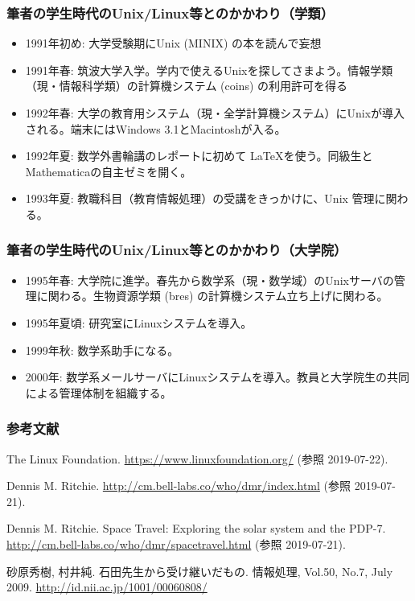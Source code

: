 \documentclass[dvipdfmx]{beamer}
\begin{document}
\begin{frame}%
    \frametitle{筆者の学生時代のUnix/Linux等とのかかわり（学類）}
    \begin{itemize}
        \item<1-> 1991年初め: 大学受験期にUnix (MINIX) の本を読んで妄想
        \item<2-> 1991年春: 筑波大学入学。学内で使えるUnixを探してさまよう。情報学類（現・情報科学類）の計算機システム (coins) の利用許可を得る
        \item<3-> 1992年春: 大学の教育用システム（現・全学計算機システム）にUnixが導入される。端末にはWindows 3.1とMacintoshが入る。
        \item<4-> 1992年夏: 数学外書輪講のレポートに初めて \LaTeX を使う。同級生とMathematicaの自主ゼミを開く。
        \item<5-> 1993年夏: 教職科目（教育情報処理）の受講をきっかけに、Unix 管理に関わる。
    \end{itemize}
\end{frame}

\begin{frame}%
    \frametitle{筆者の学生時代のUnix/Linux等とのかかわり（大学院）}
    \begin{itemize}
        \item<1-> 1995年春: 大学院に進学。春先から数学系（現・数学域）のUnixサーバの管理に関わる。生物資源学類 (bres) の計算機システム立ち上げに関わる。
        \item<2-> 1995年夏頃: 研究室にLinuxシステムを導入。
        \item<3-> 1999年秋: 数学系助手になる。
        \item<4-> 2000年: 数学系メールサーバにLinuxシステムを導入。教員と大学院生の共同による管理体制を組織する。
    \end{itemize}
\end{frame}

\begin{frame}[allowframebreaks]
    \frametitle{参考文献}
    \begin{thebibliography}{99}

         The Linux Foundation. \url{https://www.linuxfoundation.org/} (参照 2019-07-22).

         Dennis M. Ritchie. \url{http://cm.bell-labs.co/who/dmr/index.html} (参照 2019-07-21).

         Dennis M. Ritchie. Space Travel: Exploring the solar system and the PDP-7. \url{http://cm.bell-labs.co/who/dmr/spacetravel.html} (参照 2019-07-21).
        
         砂原秀樹, 村井純. 石田先生から受け継いだもの. 情報処理, Vol.50, No.7, July 2009. \url{http://id.nii.ac.jp/1001/00060808/}

        
    \end{thebibliography}    
\end{frame}
\end{document}
